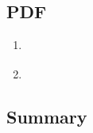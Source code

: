 \subsection{PDF}

\begin{enumerate}
    \item[] 
    \hfill \cite{statistics/book/Statistics-for-Data-Scientists/Maurits-Kaptein}

    \item 
    \hfill \cite{statistics/book/Statistics-for-Data-Scientists/Maurits-Kaptein}
\end{enumerate}


\subsection{Summary}

